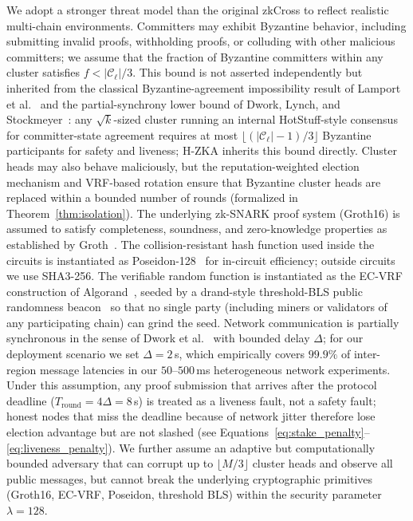 \documentclass[journal]{IEEEtran}
\begin{document}
We adopt a stronger threat model than the original zkCross to reflect realistic multi-chain environments. Committers may exhibit Byzantine behavior, including submitting invalid proofs, withholding proofs, or colluding with other malicious committers; we assume that the fraction of Byzantine committers within any cluster satisfies $f < |\mathcal{C}_\ell|/3$. This bound is not asserted independently but inherited from the classical Byzantine-agreement impossibility result of Lamport et al.~\cite{lamport1982byzantine} and the partial-synchrony lower bound of Dwork, Lynch, and Stockmeyer~\cite{dwork1988consensus}: any $\sqrt{k}$-sized cluster running an internal HotStuff-style consensus~\cite{yin2019hotstuff} for committer-state agreement requires at most $\lfloor (|\mathcal{C}_\ell|-1)/3 \rfloor$ Byzantine participants for safety and liveness; H-ZKA inherits this bound directly. Cluster heads may also behave maliciously, but the reputation-weighted election mechanism and VRF-based rotation ensure that Byzantine cluster heads are replaced within a bounded number of rounds (formalized in Theorem~\ref{thm:isolation}). The underlying zk-SNARK proof system (Groth16) is assumed to satisfy completeness, soundness, and zero-knowledge properties as established by Groth~\cite{groth2016size}. The collision-resistant hash function used inside the circuits is instantiated as Poseidon-128~\cite{poseidon} for in-circuit efficiency; outside circuits we use SHA3-256. The verifiable random function is instantiated as the EC-VRF construction of Algorand~\cite{chen2017algorand}, seeded by a drand-style threshold-BLS public randomness beacon~\cite{drand} so that no single party (including miners or validators of any participating chain) can grind the seed. Network communication is partially synchronous in the sense of Dwork et al.~\cite{dwork1988consensus} with bounded delay $\Delta$; for our deployment scenario we set $\Delta = 2\,$s, which empirically covers $99.9\%$ of inter-region message latencies in our $50$--$500\,$ms heterogeneous network experiments. Under this assumption, any proof submission that arrives after the protocol deadline ($T_{\mathrm{round}} = 4\Delta = 8\,$s) is treated as a {liveness} fault, not a safety fault; honest nodes that miss the deadline because of network jitter therefore lose election advantage but are not slashed (see Equations~\ref{eq:stake_penalty}--\ref{eq:liveness_penalty}). We further assume an adaptive but computationally bounded adversary that can corrupt up to $\lfloor M/3 \rfloor$ cluster heads and observe all public messages, but cannot break the underlying cryptographic primitives (Groth16, EC-VRF, Poseidon, threshold BLS) within the security parameter $\lambda = 128$.
\end{document}
